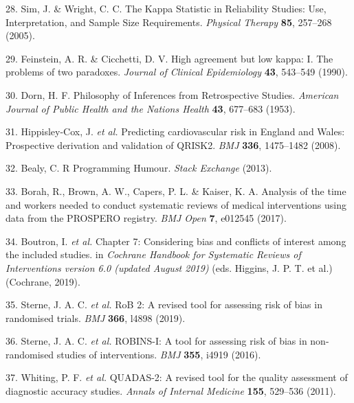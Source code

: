 \documentclass[a4paper, twoside]{templates/ociamthesis}
\begin{document}
\leavevmode\hypertarget{ref-sim2005}{}%
28. Sim, J. \& Wright, C. C. The Kappa Statistic in Reliability Studies: Use, Interpretation, and Sample Size Requirements. \emph{Physical Therapy} \textbf{85}, 257--268 (2005).

\leavevmode\hypertarget{ref-feinstein1990}{}%
29. Feinstein, A. R. \& Cicchetti, D. V. High agreement but low kappa: I. The problems of two paradoxes. \emph{Journal of Clinical Epidemiology} \textbf{43}, 543--549 (1990).

\leavevmode\hypertarget{ref-dorn1953}{}%
30. Dorn, H. F. Philosophy of Inferences from Retrospective Studies. \emph{American Journal of Public Health and the Nations Health} \textbf{43}, 677--683 (1953).

\leavevmode\hypertarget{ref-hippisley-cox2008}{}%
31. Hippisley-Cox, J. \emph{et al.} Predicting cardiovascular risk in England and Wales: Prospective derivation and validation of QRISK2. \emph{BMJ} \textbf{336}, 1475--1482 (2008).

\leavevmode\hypertarget{ref-bealy2013}{}%
32. Bealy, C. R Programming Humour. \emph{Stack Exchange} (2013).

\leavevmode\hypertarget{ref-borah2017}{}%
33. Borah, R., Brown, A. W., Capers, P. L. \& Kaiser, K. A. Analysis of the time and workers needed to conduct systematic reviews of medical interventions using data from the PROSPERO registry. \emph{BMJ Open} \textbf{7}, e012545 (2017).

\leavevmode\hypertarget{ref-cochranechpt7}{}%
34. Boutron, I. \emph{et al.} Chapter 7: Considering bias and conflicts of interest among the included studies. in \emph{Cochrane Handbook for Systematic Reviews of Interventions version 6.0 (updated August 2019)} (eds. Higgins, J. P. T. et al.) (Cochrane, 2019).

\leavevmode\hypertarget{ref-sterne2019rob}{}%
35. Sterne, J. A. C. \emph{et al.} RoB 2: A revised tool for assessing risk of bias in randomised trials. \emph{BMJ} \textbf{366}, l4898 (2019).

\leavevmode\hypertarget{ref-sterne2016robins}{}%
36. Sterne, J. A. C. \emph{et al.} ROBINS-I: A tool for assessing risk of bias in non-randomised studies of interventions. \emph{BMJ} \textbf{355}, i4919 (2016).

\leavevmode\hypertarget{ref-whiting2011quadas}{}%
37. Whiting, P. F. \emph{et al.} QUADAS-2: A revised tool for the quality assessment of diagnostic accuracy studies. \emph{Annals of Internal Medicine} \textbf{155}, 529--536 (2011).
\end{document}
